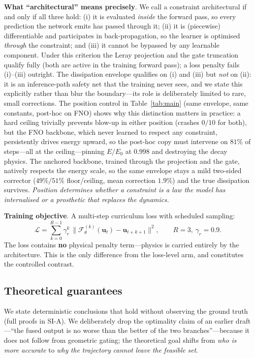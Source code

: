 \documentclass[11pt,a4paper]{article}
\newcommand{\bu}{\bm{u}}
\newcommand{\cF}{\mathcal{F}}
\begin{document}
\textbf{What ``architectural'' means precisely}. We call a constraint architectural if and only if all three hold: (i) it is evaluated \emph{inside} the forward pass, so every prediction the network emits has passed through it; (ii) it is (piecewise) differentiable and participates in back-propagation, so the learner is optimised \emph{through} the constraint; and (iii) it cannot be bypassed by any learnable component. Under this criterion the Leray projection and the gate truncation qualify fully (both are active in the training forward pass); a loss penalty fails (i)--(iii) outright. The dissipation envelope qualifies on (i) and (iii) but \emph{not} on (ii): it is an inference-path safety net that the training never sees, and we state this explicitly rather than blur the boundary---its role is deliberately limited to rare, small corrections. The position control in Table~\ref{tab:main} (same envelope, same constants, post-hoc on FNO) shows why this distinction matters in practice: a hard ceiling trivially prevents blow-up in either position (crashes $0/10$ for both), but the FNO backbone, which never learned to respect any constraint, persistently drives energy upward, so the post-hoc copy must intervene on $81\%$ of steps---all at the ceiling---pinning $E/E_0$ at $0.998$ and destroying the decay physics. The anchored backbone, trained through the projection and the gate, natively respects the energy scale, so the same envelope stays a mild two-sided corrector ($49\%/51\%$ floor/ceiling, mean correction $1.9\%$) and the true dissipation survives. \emph{Position determines whether a constraint is a law the model has internalised or a prosthetic that replaces the dynamics.}

\textbf{Training objective}. A multi-step curriculum loss with scheduled sampling:
\begin{equation}
\mathcal{L}=\sum_{k=0}^{R-1}\gamma_r^{k}\,\big\|\cF_\theta^{(k)}(\bu_t)-\bu_{t+k+1}\big\|^2,\qquad R=3,\ \gamma_r=0.9 .
\label{eq:loss}
\end{equation}
The loss contains \textbf{no} physical penalty term---physics is carried entirely by the architecture. This is the only difference from the loss-level arm, and constitutes the controlled contrast.

\subsection{Theoretical guarantees}\label{sec:theory}

We state deterministic conclusions that hold without observing the ground truth (full proofs in SI-A). We deliberately drop the optimality claim of an earlier draft---``the fused output is no worse than the better of the two branches''---because it does not follow from geometric gating; the theoretical goal shifts from \emph{who is more accurate} to \emph{why the trajectory cannot leave the feasible set}.
\end{document}
